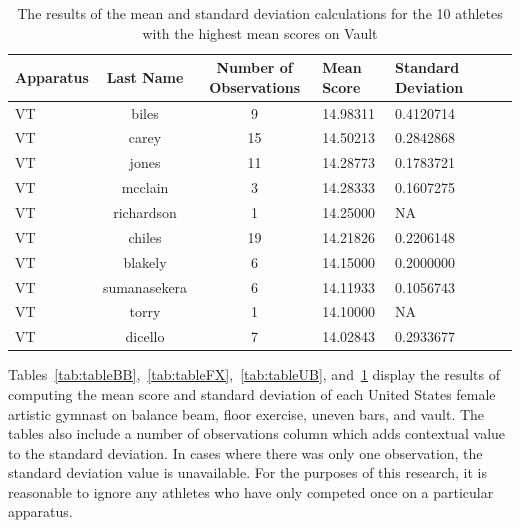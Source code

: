 \documentclass[12pt]{article}
\begin{document}
 \begin{table}[tbp]
  \caption{The results of the mean and standard deviation calculations for the 10 athletes with the highest 
  mean scores on Vault}
  \label{tab:tableVT}
\centering
\begin{tabular}[t]{lccllll}
 \toprule
  Apparatus & Last Name & Number of Observations & Mean Score & Standard Deviation\\
  \midrule
  VT & biles & 9 & 14.98311 & 0.4120714\\
  \midrule
  VT & carey & 15 & 14.50213 & 0.2842868\\
  \midrule
  VT & jones & 11 & 14.28773 & 0.1783721\\
  \midrule
  VT & mcclain & 3 & 14.28333 & 0.1607275\\
  \midrule
  VT & richardson & 1 & 14.25000 & NA\\
  \midrule
  VT & chiles & 19 & 14.21826 & 0.2206148\\
  \midrule
  VT & blakely & 6 & 14.15000 & 0.2000000\\
  \midrule
  VT & sumanasekera & 6 & 14.11933 & 0.1056743\\
  \midrule
  VT & torry & 1 & 14.10000 & NA\\
  \midrule
  VT & dicello & 7 & 14.02843 & 0.2933677\\
   \bottomrule
\end{tabular}
\end{table}

Tables~\ref{tab:tableBB},~\ref{tab:tableFX},~\ref{tab:tableUB}, and~\ref{tab:tableVT} display the results of 
computing the mean score and standard deviation of each United States female artistic gymnast on balance beam, floor 
exercise, uneven bars, and vault. The tables also include a number of observations column which adds contextual 
value to the standard deviation. In cases where there was only one observation, the standard deviation value is unavailable.
For the purposes of this research, it is reasonable to ignore any athletes who have only competed once on a particular apparatus.
\end{document}
